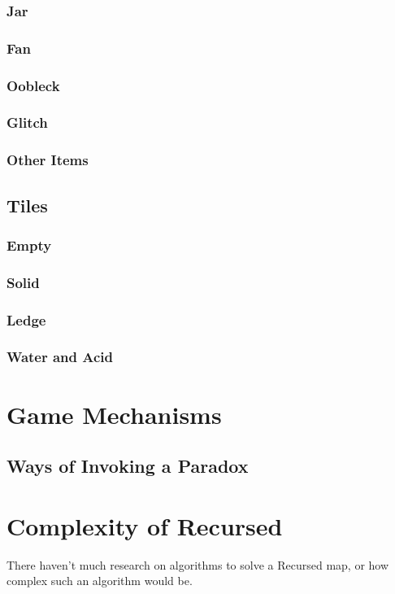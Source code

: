 \documentclass[a4paper]{article}
\theoremstyle{theorem}
\theoremstyle{definition}
\begin{document}
\subsubsection{Jar}
\subsubsection{Fan}
\subsubsection{Oobleck}
\subsubsection{Glitch}
\subsubsection{Other Items}

\subsection{Tiles}
\subsubsection{Empty}
\subsubsection{Solid}
\subsubsection{Ledge}
\subsubsection{Water and Acid}

\section{Game Mechanisms}
\subsection{Ways of Invoking a Paradox}

\section{Complexity of Recursed}
There haven't much research on algorithms to solve a Recursed map, or how complex such an algorithm would be.
\end{document}
